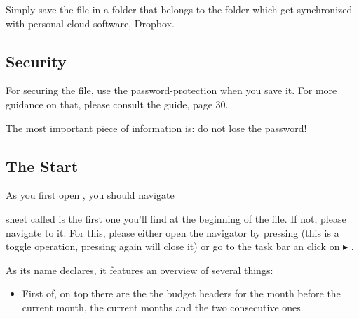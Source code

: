 Simply save the file in a folder that belongs to the folder which get synchronized with personal cloud software, \eg Dropbox.

\subsection{Security}
\label{subsec:security}

For securing the file, use the password-protection when you save it.
For more guidance on that, please consult the  guide, page 30.

The most important piece of information is: do not lose the password!

\subsection{The Start}
\label{subsec:opening-the-file}

As you first open \tfn, you should navigate

sheet called  is the first one you'll find at the beginning of the file.
If not, please navigate to it.
For this, please either open the navigator by pressing  (this is a toggle operation, pressing  again will close it) or go to the task bar an click on  \( \blacktriangleright \) .

As its name declares, it features an overview of several things:
\begin{itemize}
	\item First of, on top there are the the budget headers for the month before the current month, the current months and the two consecutive ones.
\end{itemize}

